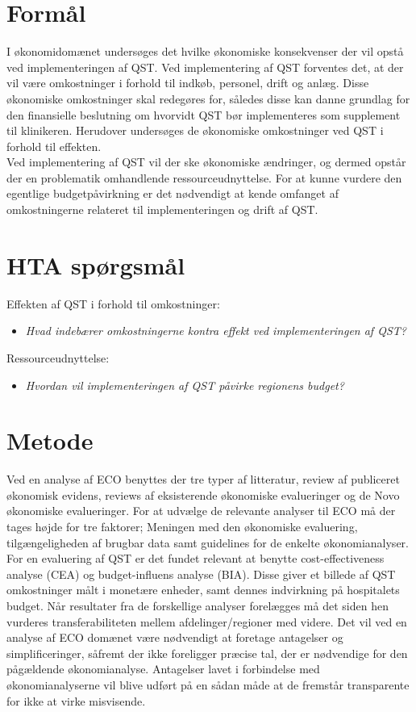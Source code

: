 \section{Formål}
I økonomidomænet undersøges det hvilke økonomiske konsekvenser der vil opstå ved implementeringen af QST. Ved implementering af QST forventes det, at der vil være omkostninger i forhold til indkøb, personel, drift og anlæg. Disse økonomiske omkostninger skal redegøres for, således disse kan danne grundlag for den finansielle beslutning om hvorvidt QST bør implementeres som supplement til klinikeren. Herudover undersøges de økonomiske omkostninger ved QST i forhold til effekten.\\ 
Ved implementering af  QST vil der ske økonomiske ændringer, og dermed opstår der en problematik omhandlende ressourceudnyttelse. For at kunne vurdere den egentlige budgetpåvirkning er det nødvendigt at kende omfanget af  omkostningerne relateret til implementeringen og drift af QST. 


\section{HTA spørgsmål}
Effekten af QST i forhold til omkostninger:
\begin{itemize}
	\item \textit{Hvad indebærer omkostningerne kontra effekt ved implementeringen af QST?} %
\end{itemize}


Ressourceudnyttelse:
\begin{itemize}
	\item \textit{Hvordan vil implementeringen af QST påvirke regionens budget?} %
\end{itemize}


\section{Metode}
Ved en analyse af ECO benyttes der tre typer af litteratur, review af publiceret økonomisk evidens, reviews af eksisterende økonomiske evalueringer og de Novo økonomiske evalueringer. For at udvælge de relevante analyser til ECO må der tages højde for tre faktorer; Meningen med den økonomiske evaluering, tilgængeligheden af brugbar data samt guidelines for de enkelte økonomianalyser. For en evaluering af QST er det fundet relevant at benytte cost-effectiveness analyse (CEA) og budget-influens analyse (BIA). Disse giver et billede af QST omkostninger målt i monetære enheder, samt dennes indvirkning på hospitalets budget. Når resultater fra de forskellige analyser forelægges må det siden hen vurderes transferabiliteten mellem afdelinger/regioner med videre. Det vil ved en analyse af ECO domænet være nødvendigt at foretage antagelser og simplificeringer, såfremt der ikke foreligger præcise tal, der er nødvendige for den pågældende økonomianalyse. Antagelser lavet i forbindelse med økonomianalyserne vil blive udført på en sådan måde at de fremstår transparente for ikke at virke misvisende.


